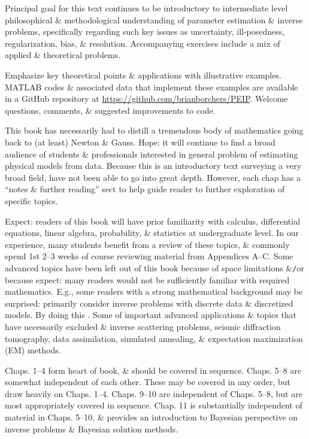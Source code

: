\documentclass{article}
\begin{document}
\begin{itemize}
	Principal goal for this text continues to be introductory to intermediate level philosophical \& methodological understanding of parameter estimation \& inverse problems, specifically regarding such key issues as uncertainty, ill-posedness, regularization, bias, \& resolution. Accompanying exercises include a mix of applied \& theoretical problems.
	
	Emphasize key theoretical points \& applications with illustrative examples. MATLAB codes \& associated data that implement these examples are available in a GitHub repository at \url{https://github.com/brianborchers/PEIP}. Welcome questions, comments, \& suggested improvements to code.
	
	This book has necessarily had to distill a tremendous body of mathematics going back to (at least) {\sc Newton \& Gauss}. Hope: it will continue to find a broad audience of students \& professionals interested in general problem of estimating physical models from data. Because this is an introductory text surveying a very broad field, have not been able to go into great depth. However, each chap has a ``notes \& further reading'' sect to help guide reader to further exploration of specific topics.
	
	Expect: readers of this book will have prior familiarity with calculus, differential equations, linear algebra, probability, \& statistics at undergraduate level. In our experience, many students benefit from a review of these topics, \& commonly spend 1st 2--3 weeks of course reviewing material from Appendices A--C. Some advanced topics have been left out of this book because of space limitations \&{\tt/}or because expect: many readers would not be sufficiently familiar with required mathematics. E.g., some readers with a strong mathematical background may be surprised: primarily consider inverse problems with discrete data \& discretized models. By doing this . Some of important advanced applications \& topics that have necessarily excluded \& inverse scattering problems, seismic diffraction tomography, data assimilation, simulated annealing, \& expectation maximization (EM) methods.
	
	Chaps. 1--4 form heart of book, \& should be covered in sequence. Chaps. 5--8 are somewhat independent of each other. These may be covered in any order, but draw heavily on Chaps. 1--4. Chaps. 9--10 are independent of Chaps. 5--8, but are most appropriately covered in sequence. Chap. 11 is substantially independent of material in Chaps. 5--10, \& provides an introduction to Bayesian perspective on inverse problems \& Bayesian solution methods.
	

\end{itemize}
\end{document}
